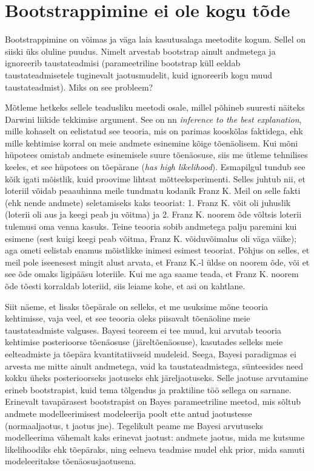 \documentclass[]{book}
\begin{document}
\section*{Bootstrappimine ei ole kogu
tõde}\label{bootstrappimine-ei-ole-kogu-tode}

Bootstrappimine on võimas ja väga laia kasutusalaga meetodite kogum.
Sellel on siiski üks oluline puudus. Nimelt arvestab bootstrap ainult
andmetega ja ignoreerib taustateadmisi (parameetriline bootstrap küll
eeldab taustateadmisetele tuginevalt jaotusmudelit, kuid ignoreerib kogu
muud taustateadmist). Miks on see probleem?

Mõtleme hetkeks sellele teadusliku meetodi osale, millel põhineb
suuresti näiteks Darwini liikide tekkimise argument. See on nn
\emph{inference to the best explanation}, mille kohaselt on eelistatud
see teooria, mis on parimas kooskõlas faktidega, ehk mille kehtimise
korral on meie andmete esinemine kõige tõenäolisem. Kui mõni hüpotees
omistab andmete esinemisele suure tõenäosuse, siis me ütleme tehnilises
keeles, et see hüpotees on tõepärane (\emph{has high likelihood}).
Esmapilgul tundub see kõik igati mõistlik, kuid proovime lihtsat
mõtteeksperimenti. Selles juhtub nii, et loteriil võidab peaauhinna
meile tundmatu kodanik Franz K. Meil on selle fakti (ehk nende andmete)
seletamiseks kaks teooriat: 1. Franz K. võit oli juhuslik (loterii oli
aus ja keegi peab ju võitma) ja 2. Franz K. noorem õde võltsis loterii
tulemusi oma venna kasuks. Teine teooria sobib andmetega palju paremini
kui esimene (sest kuigi keegi peab võitma, Franz K. võiduvõimalus oli
väga väike); aga ometi eelistab enamus mõistlikke inimesi esimest
teooriat. Põhjus on selles, et meil pole iseenesest mingit alust arvata,
et Franz K.-l üldse on noorem õde, või et see õde omaks ligipääsu
loteriile. Kui me aga saame teada, et Franz K. noorem õde tõesti
korraldab loteriid, siis leiame kohe, et asi on kahtlane.

Siit näeme, et lisaks tõepärale on selleks, et me usuksime mõne teooria
kehtimisse, vaja veel, et see teooria oleks piisavalt tõenäoline meie
taustateadmiste valguses. Bayesi teoreem ei tee muud, kui arvutab
teooria kehtimise posterioorse tõenäosuse (järeltõenäosuse), kasutades
selleks meie eelteadmiste ja tõepära kvantitatiivseid mudeleid. Seega,
Bayesi paradigmas ei arvesta me mitte ainult andmetega, vaid ka
taustateadmistega, sünteesides need kokku üheks posterioorseks jaotuseks
ehk järeljaotuseks. Selle jaotuse arvutamine erineb bootstrapist, kuid
tema tõlgendus ja praktiline töö sellega on sarnane. Erinevalt
tavapärasest bootstrapist on Bayes parameetriline meetod, mis sõltub
andmete modelleerimisest modeleerija poolt ette antud jaotustesse
(normaaljaotus, t jaotus jne). Tegelikult peame me Bayesi arvutuseks
modelleerima vähemalt kaks erinevat jaotust: andmete jaotus, mida me
kutsume likelihoodiks ehk tõepäraks, ning eelneva teadmise mudel ehk
prior, mida samuti modeleeritakse tõenäosusjaotusena.
\end{document}
